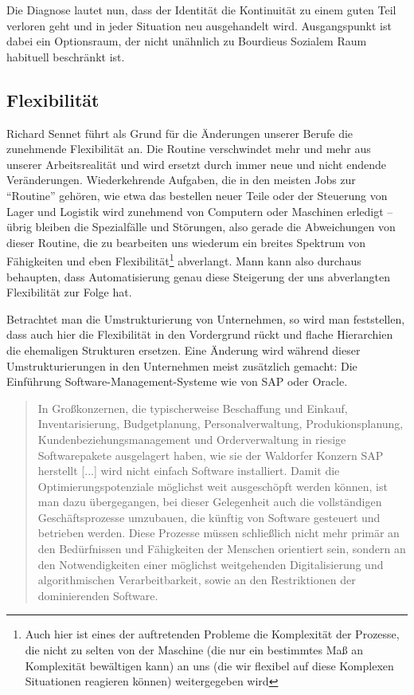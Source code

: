 Die Diagnose lautet nun, dass der Identität die Kontinuität zu einem guten Teil verloren geht und in jeder Situation neu ausgehandelt wird.
Ausgangspunkt ist dabei ein Optionsraum, der nicht unähnlich zu Bourdieus Sozialem Raum habituell beschränkt ist.


\subsection{Flexibilität}

Richard Sennet führt als Grund für die Änderungen unserer Berufe die zunehmende Flexibilität an.
Die Routine verschwindet mehr und mehr aus unserer Arbeitsrealität und wird ersetzt durch immer neue und nicht endende Veränderungen.
Wiederkehrende Aufgaben, die in den meisten Jobs zur \enquote{Routine} gehören, wie etwa das bestellen neuer Teile oder der Steuerung von Lager und Logistik wird zunehmend von Computern oder Maschinen erledigt – übrig bleiben die Spezialfälle und Störungen, also gerade die Abweichungen von dieser Routine, die zu bearbeiten uns wiederum ein breites Spektrum von Fähigkeiten und eben Flexibilität\footnote{Auch hier ist eines der auftretenden Probleme die Komplexität der Prozesse, die nicht zu selten von der Maschine (die nur ein bestimmtes Maß an Komplexität bewältigen kann) an uns (die wir flexibel auf diese Komplexen Situationen reagieren können) weitergegeben wird} abverlangt.
Mann kann also durchaus behaupten, dass Automatisierung genau diese Steigerung der uns abverlangten Flexibilität zur Folge hat.

Betrachtet man die Umstrukturierung von Unternehmen, so wird man feststellen, dass auch hier die Flexibilität in den Vordergrund rückt und flache Hierarchien die ehemaligen Strukturen ersetzen.
Eine Änderung wird während dieser Umstrukturierungen in den Unternehmen meist zusätzlich gemacht: Die Einführung Software-Management-Systeme wie von SAP oder Oracle.

\begin{quote}
	In Großkonzernen, die typischerweise Beschaffung und Einkauf, Inventarisierung, Budgetplanung, Personalverwaltung, Produkionsplanung, Kundenbeziehungsmanagement und Orderverwaltung in riesige Softwarepakete ausgelagert haben, wie sie der Waldorfer Konzern SAP herstellt [...] wird nicht einfach Software installiert. Damit die Optimierungspotenziale möglichst weit ausgeschöpft werden können, ist man dazu übergegangen, bei dieser Gelegenheit auch die vollständigen Geschäftsprozesse umzubauen, die künftig von Software gesteuert und betrieben werden. Diese Prozesse müssen schließlich nicht mehr primär an den Bedürfnissen und Fähigkeiten der Menschen orientiert sein, sondern an den Notwendigkeiten einer möglichst weitgehenden Digitalisierung und algorithmischen Verarbeitbarkeit, sowie an den Restriktionen der dominierenden Software.
	
	\em \cite[172f.]{arbeitsfrei}
\end{quote}


